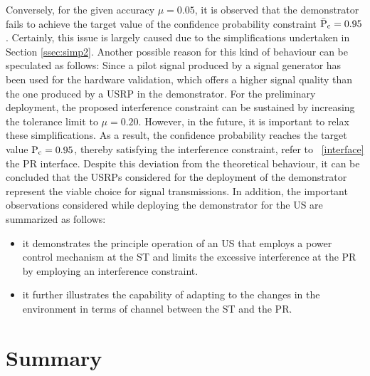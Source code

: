 Conversely, for the given accuracy $\mu = 0.05$, it is observed that the demonstrator fails to achieve the target value of the confidence probability constraint $\bar{\text{P}}_{\text{c}} = 0.95$. Certainly, this issue is largely caused due to the simplifications undertaken in Section \ref{ssec:simp2}. 
Another possible reason for this kind of behaviour can be speculated as follows: Since a pilot signal produced by a signal generator has been used for the hardware validation, which offers a higher signal quality than the one produced by a USRP in the demonstrator. 
For the preliminary deployment, the proposed interference constraint can be sustained by increasing the tolerance limit to $\mu = 0.20$. However, in the future, it is important to relax these simplifications. As a result, the confidence probability reaches the target value $\text{P}_{\text{c}} = 0.95$, thereby satisfying the interference constraint, refer to \figurename~\ref{interface} the PR interface. Despite this deviation from the theoretical behaviour, it can be concluded that the USRPs considered for the deployment of the demonstrator represent the viable choice for signal transmissions. In addition, the important observations considered while deploying the demonstrator for the US are summarized as follows: \begin{itemize} \item it demonstrates the principle operation of an US that employs a power control mechanism at the ST and limits the excessive interference at the PR by employing an interference constraint. \item it further illustrates the capability of adapting to the changes in the environment in terms of channel between the ST and the PR.  \end{itemize}

\section{Summary}
\label{con}


